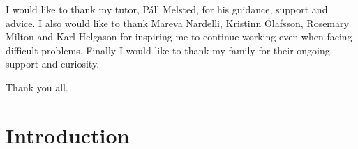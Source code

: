 \documentclass[a4paper,12pt,twoside,BCOR=10mm]{scrbook}
\begin{document}
%
%
%
%
% 

I would like to thank my tutor, Páll Melsted, for his guidance, support and advice. 
I also would like to thank Mareva Nardelli, Kristinn Ólafsson, Rosemary Milton and Karl Helgason 
for inspiring me to continue working even when facing difficult problems. 
Finally I would like to thank my family for their ongoing support and curiosity.

Thank you all.

\chapter{Introduction}
\setcounter{page}{1}

\end{document}
